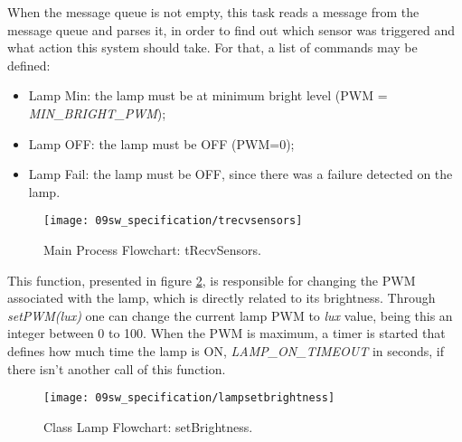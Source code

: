 When the message queue is not empty, this task reads a message from the message queue and parses it, in order to find out which sensor was triggered and what action this system should take. For that, a list of commands may be defined:
\begin{itemize}
	\item Lamp Min: the lamp must be at minimum bright level (PWM = \textit{MIN\_BRIGHT\_PWM});
	\item Lamp OFF: the lamp must be OFF (PWM=0);
	\item Lamp Fail: the lamp must be OFF, since there was a failure detected on the lamp.
\end{itemize}

\begin{figure}[H]
	\centering
	\texttt{[image: 09sw\_specification/trecvsensors]}
	\caption{Main Process Flowchart: tRecvSensors.}
	\label{fig:flow_trecv_sensors}
\end{figure}

\clearpage
%
%


This function, presented in figure \ref{fig:flow_setbrightness}, is responsible for changing the PWM associated with the lamp, which is directly related to its brightness. Through \textit{setPWM(lux)} one can change the current lamp PWM to \textit{lux} value, being this an integer between 0 to 100. When the PWM is maximum, a timer is started that defines how much time the lamp is ON, \textit{LAMP\_ON\_TIMEOUT} in seconds, if there isn't another call of this function.

\begin{figure}[H]
	\centering	
	\texttt{[image: 09sw\_specification/lampsetbrightness]}
	\caption{Class Lamp Flowchart: setBrightness.}
	\label{fig:flow_setbrightness}
\end{figure}


